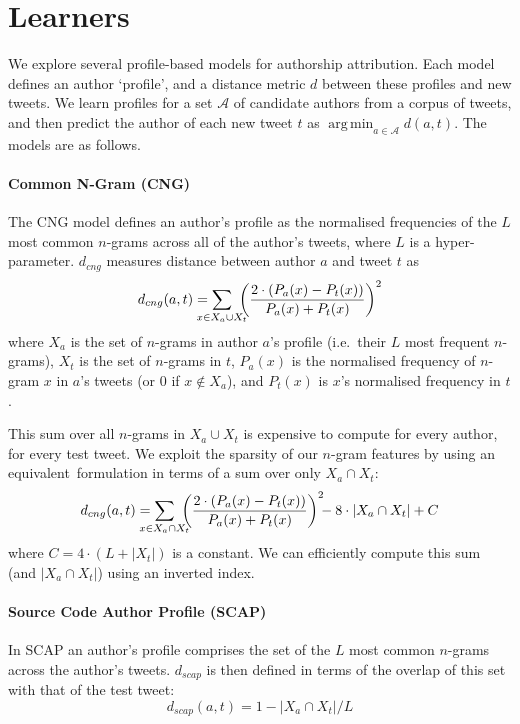 \documentclass[twocolumn,10pt]{article}
\DeclareMathOperator*{\argmin}{arg\,min}
\begin{document}
\section{Learners}

We explore several profile-based models for authorship attribution.
Each model defines an author  `profile', and a distance metric $d$
between these profiles and new tweets.
We learn profiles for a set $\mathcal{A}$ of candidate authors from
a corpus of tweets, and then predict the author of each new tweet
$t$ as $\argmin_{a \in \mathcal{A}} d(a, t)$.
The models are as follows.

\paragraph{Common N-Gram (CNG)}
\hypertarget{par:cng}{}
The CNG model\supercite{kevselj2003n} defines an author's profile
as the normalised frequencies of the $L$ most common $n$-grams
across all of the author's tweets, where $L$ is a hyper-parameter.
$d_{cng}$ measures distance between author $a$ and tweet $t$ as
$$
d_{cng}(a, t) =
    \smashoperator{\sum_{x \in X_a \cup X_t}}\ 
        {\left ( \frac{2 \cdot (P_a(x) - P_t(x))}{P_a(x) + P_t(x)} \right )}^2
$$
where
$X_a$ is the set of $n$-grams in author $a$'s profile
(i.e.~their $L$ most frequent $n$-grams),
$X_t$ is the set of $n$-grams in $t$,
$P_a(x)$ is the normalised frequency of $n$-gram $x$ in $a$'s
tweets (or 0 if $x \notin X_a$),
and
$P_t(x)$ is $x$'s normalised frequency in $t$.

This sum over all $n$-grams in $X_a \cup X_t$ is expensive
to compute for every author, for every test tweet.
We exploit the sparsity of our $n$-gram features by using
an equivalent\footnotemark~formulation in terms of a sum over
only $X_a \cap X_t$:
$$
d_{cng} (a, t) =
    \smashoperator{\sum_{x \in X_a \cap X_t}}\ 
        {\left ( \frac{2 \cdot (P_a(x) - P_t(x))}{P_a(x) + P_t(x)} \right )}^2
        \hspace{-1ex}
        - 8 \cdot |X_a \cap X_t| + C
$$
where $C=4 \cdot (L + |X_t|)$ is a constant.
We can efficiently compute this sum (and $|X_a \cap X_t|$)
using an inverted index.

\paragraph{Source Code Author Profile (SCAP)}
In SCAP\supercite{frantzeskou2006effective} an author's profile
comprises the set of the $L$ most common $n$-grams across the
author's tweets. $d_{scap}$ is then defined in terms of the
overlap of this set with that of the test tweet:
$$
d_{scap}(a, t) = 1 - |X_a \cap X_t| / L
$$
\end{document}
